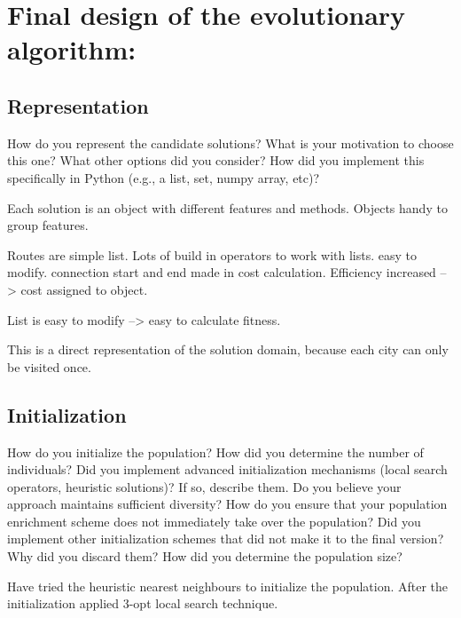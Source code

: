 \documentclass[a4paper,10pt]{article}
\newcommand{\ReplaceMe}[1]{{\color{blue}#1}}
\newcommand{\RemoveMe}[1]{{\color{purple}#1}}
\begin{document}
\section{Final design of the evolutionary algorithm:} 
%

\subsection{Representation}

\ReplaceMe{How do you represent the candidate solutions? What is your motivation to choose this one? What other options did you consider? How did you implement this specifically in Python (e.g., a list, set, numpy array, etc)?}

Each solution is an object with different features and methods. Objects handy to group features.

Routes are simple list. Lots of build in operators to work with lists. easy to modify.  connection start and end made in cost calculation. Efficiency increased --> cost assigned to object. 

List is easy to modify --> easy to calculate fitness. 

This is a direct representation of the solution domain, because each city can only be visited once.

\subsection{Initialization}

\ReplaceMe{How do you initialize the population? How did you determine the number of individuals? Did you implement advanced initialization mechanisms (local search operators, heuristic solutions)? If so, describe them. Do you believe your approach maintains sufficient diversity? How do you ensure that your population enrichment scheme does not immediately take over the population? Did you implement other initialization schemes that did not make it to the final version? Why did you discard them? How did you determine the population size?}

Have tried the heuristic nearest neighbours to initialize the population. After the initialization applied 3-opt local search technique. 
\end{document}
